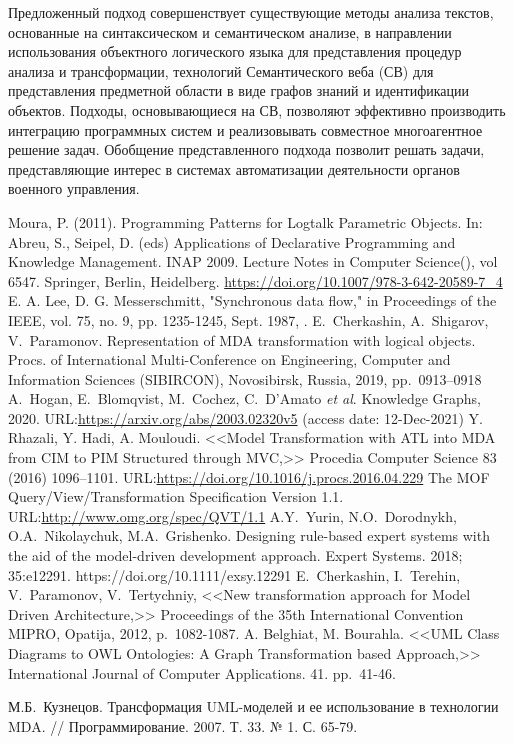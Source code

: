 \documentclass[12pt]{article}
\begin{document}
Предложенный подход совершенствует существующие методы анализа текстов, основанные на синтаксическом и семантическом анализе, в направлении использования объектного логического языка для представления процедур анализа и трансформации, технологий Семантического веба (СВ) для представления предметной области в виде графов знаний и идентификации объектов.  Подходы, основывающиеся на СВ, позволяют эффективно производить интеграцию программных систем и реализовывать совместное многоагентное решение задач.  Обобщение представленного подхода позволит решать задачи, представляющие
интерес в системах автоматизации деятельности органов военного управления.

\renewcommand\refname{\centering Литература}
\begin{thebibliography}{99}
Moura, P. (2011). Programming Patterns for Logtalk Parametric Objects. In: Abreu, S., Seipel, D. (eds) Applications of Declarative Programming and Knowledge Management. INAP 2009. Lecture Notes in Computer Science(), vol 6547. Springer, Berlin, Heidelberg. \url{https://doi.org/10.1007/978-3-642-20589-7_4}
E. A. Lee, D. G. Messerschmitt, "Synchronous data flow," in Proceedings of the IEEE, vol. 75, no. 9, pp. 1235-1245, Sept. 1987, .
 E.~Cherkashin, A.~Shigarov, V.~Paramonov. Representation of MDA transformation with logical objects.  Procs. of International Multi-Conference on Engineering, Computer and Information Sciences (SIBIRCON), Novosibirsk, Russia, 2019, pp.~0913--0918 
 A.~Hogan, E.~Blomqvist, M.~Cochez, C.~D’Amato \emph{et al}. Knowledge Graphs, 2020. URL:\url{https://arxiv.org/abs/2003.02320v5} (access date: 12-Dec-2021)
Y. Rhazali, Y. Hadi, A. Mouloudi. <<Model Transformation with ATL into MDA from CIM to PIM Structured through MVC,>> Procedia Computer Science 83 (2016) 1096–1101. URL:\url{https://doi.org/10.1016/j.procs.2016.04.229}
 The MOF Query/View/Transformation Specification Version 1.1. URL:\url{http://www.omg.org/spec/QVT/1.1}
 A.Y.~Yurin, N.O.~Dorodnykh, O.A.~Nikolaychuk, M.A.~Grishenko. Designing rule-based expert systems with the aid of the model-driven development approach. Expert Systems. 2018; 35:e12291. https://doi.org/10.1111/exsy.12291
 E.~Cherkashin, I.~Terehin, V.~Paramonov, V.~Tertychniy, <<New transformation approach for Model Driven Architecture,>> Proceedings of the 35th International Convention MIPRO, Opatija, 2012, p.~1082-1087.
 A. Belghiat, M. Bourahla. <<UML Class Diagrams to OWL Ontologies: A Graph Transformation based Approach,>> International Journal of Computer Applications. 41. pp.~41-46.

М.Б.~Кузнецов. Трансформация UML-моделей и ее использование в технологии MDA. // Программирование. 2007. Т. 33. № 1. С. 65-79.



\end{thebibliography}
\end{document}
